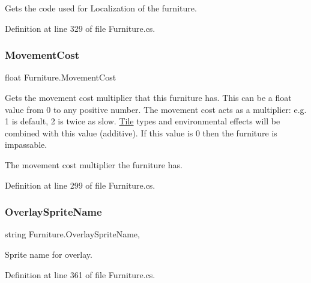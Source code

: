 Gets the code used for Localization of the furniture. 



Definition at line 329 of file Furniture.\+cs.

\mbox{\label{class_furniture_a3265b21652e2bc4c43131e8fe0b9c23f}} 
\subsubsection{\texorpdfstring{Movement\+Cost}{MovementCost}}
{\footnotesize\ttfamily float Furniture.\+Movement\+Cost\hspace{0.3cm}{\ttfamily [get]}}



Gets the movement cost multiplier that this furniture has. This can be a float value from 0 to any positive number. The movement cost acts as a multiplier\+: e.\+g. 1 is default, 2 is twice as slow. \hyperlink{class_tile}{Tile} types and environmental effects will be combined with this value (additive). If this value is \textquotesingle{}0\textquotesingle{} then the furniture is impassable. 

The movement cost multiplier the furniture has.

Definition at line 299 of file Furniture.\+cs.

\mbox{\label{class_furniture_ab8181a6ce98e986e33c2c414296787a2}} 
\subsubsection{\texorpdfstring{Overlay\+Sprite\+Name}{OverlaySpriteName}}
{\footnotesize\ttfamily string Furniture.\+Overlay\+Sprite\+Name\hspace{0.3cm}{\ttfamily [get]}, {\ttfamily [set]}}



Sprite name for overlay. 



Definition at line 361 of file Furniture.\+cs.

\mbox{\label{class_furniture_ae388e4eddbd3745a5cc7f3505b7abfca}} 
